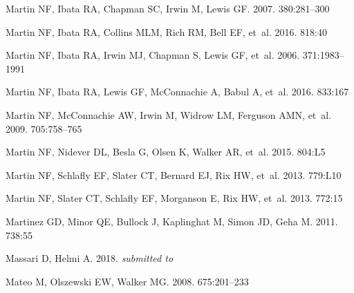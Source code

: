 \documentclass[a4paper]{ar-1col}
\begin{document}
\begin{thebibliography}{}
{Martin} NF, {Ibata} RA, {Chapman} SC, {Irwin} M, {Lewis} GF. 2007.
\textit{\mnras} 380:281--300

{Martin} NF, {Ibata} RA, {Collins} MLM, {Rich} RM, {Bell} EF, et~al.
  2016{}.
\textit{\apj} 818:40

{Martin} NF, {Ibata} RA, {Irwin} MJ, {Chapman} S, {Lewis} GF, et~al. 2006.
\textit{\mnras} 371:1983--1991

{Martin} NF, {Ibata} RA, {Lewis} GF, {McConnachie} A, {Babul} A, et~al.
  2016{}.
\textit{\apj} 833:167

{Martin} NF, {McConnachie} AW, {Irwin} M, {Widrow} LM, {Ferguson} AMN, et~al.
  2009.
\textit{\apj} 705:758--765

{Martin} NF, {Nidever} DL, {Besla} G, {Olsen} K, {Walker} AR, et~al. 2015.
\textit{\apjl} 804:L5

{Martin} NF, {Schlafly} EF, {Slater} CT, {Bernard} EJ, {Rix} HW, et~al.
  2013{}.
\textit{\apjl} 779:L10

{Martin} NF, {Slater} CT, {Schlafly} EF, {Morganson} E, {Rix} HW, et~al.
  2013{}.
\textit{\apj} 772:15

{Martinez} GD, {Minor} QE, {Bullock} J, {Kaplinghat} M, {Simon} JD, {Geha} M.
  2011.
\textit{\apj} 738:55

{Massari} D, {Helmi} A. 2018.
\textit{submitted to \aap}

{Mateo} M, {Olszewski} EW, {Walker} MG. 2008.
\textit{\apj} 675:201--233


\end{thebibliography}
\end{document}
